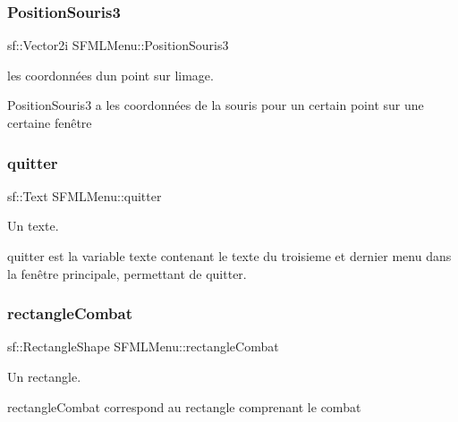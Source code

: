 \subsubsection{\texorpdfstring{Position\+Souris3}{PositionSouris3}}
{\footnotesize\ttfamily sf\+::\+Vector2i S\+F\+M\+L\+Menu\+::\+Position\+Souris3\hspace{0.3cm}{\ttfamily [private]}}



les coordonnées d\textquotesingle{}un point sur l\textquotesingle{}image. 

Position\+Souris3 a les coordonnées de la souris pour un certain point sur une certaine fenêtre \mbox{\label{class_s_f_m_l_menu_aedb41cd07e45690aca5797cc867300dc}} 
\subsubsection{\texorpdfstring{quitter}{quitter}}
{\footnotesize\ttfamily sf\+::\+Text S\+F\+M\+L\+Menu\+::quitter\hspace{0.3cm}{\ttfamily [private]}}



Un texte. 

quitter est la variable texte contenant le texte du troisieme et dernier menu dans la fenêtre principale, permettant de quitter. \mbox{\label{class_s_f_m_l_menu_a0b71112f9f5fe621ffce9171c711ef7c}} 
\subsubsection{\texorpdfstring{rectangle\+Combat}{rectangleCombat}}
{\footnotesize\ttfamily sf\+::\+Rectangle\+Shape S\+F\+M\+L\+Menu\+::rectangle\+Combat\hspace{0.3cm}{\ttfamily [private]}}



Un rectangle. 

rectangle\+Combat correspond au rectangle comprenant le combat \mbox{\label{class_s_f_m_l_menu_a37061fedec37dcaa42ba762b28ebdc9f}} 

